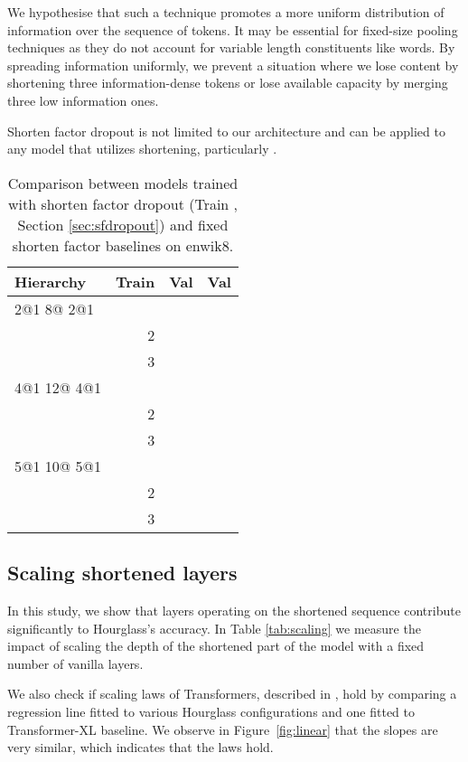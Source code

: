 \documentclass[11pt]{article}
\begin{document}
We hypothesise that such a technique promotes a more uniform distribution of information over the sequence of tokens. It may be essential for fixed-size pooling techniques as they do not account for variable length constituents like words. By spreading information uniformly, we prevent a situation where we lose content by shortening three information-dense tokens or lose available capacity by merging three low information ones.

Shorten factor dropout is not limited to our architecture and can be applied to any model that utilizes shortening, particularly \cite{dai2020funneltransformer}.

\begin{table}[ht!]
\small
\centering
\setlength{\tabcolsep}{0.8em}
\begin{tabular}{lrrr}
\hline
Hierarchy & Train  & Val  & Val  \\
\hline
2@1 8@ 2@1 &  &  &  \\
              & 2 &  &         \\
              & 3 &         &  \\
\hline
4@1 12@ 4@1 &  &  &  \\
              & 2 &  &         \\
              & 3 &         &  \\
\hline
5@1 10@ 5@1 &  &  &  \\
              & 2 &  &         \\
              & 3 &         &  \\
\hline
\end{tabular}
\caption{Comparison between models trained with shorten factor dropout (Train , Section \ref{sec:sfdropout}) and fixed shorten factor baselines on enwik8.}
\label{tab:sfdropout}
\end{table}

\vspace{-5mm}
\subsection{Scaling shortened layers}\label{sec:scaling}
In this study, we show that layers operating on the shortened sequence contribute significantly to Hourglass's accuracy. In Table \ref{tab:scaling} we measure the impact of scaling the depth of the shortened part of the model with a fixed number of vanilla layers.

We also check if scaling laws of Transformers, described in \cite{kaplan2020scaling}, hold by comparing a regression line fitted to various Hourglass configurations and one fitted to Transformer-XL baseline. We observe in Figure~\ref{fig:linear} that the slopes are very similar, which indicates that the laws hold.
\end{document}
